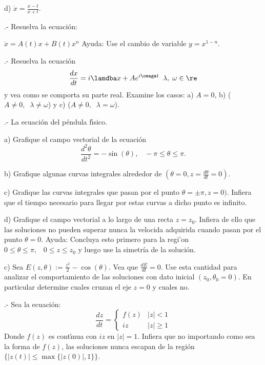 d) $\dot{x} = \frac{x-t}{x+t}$.
\ePro

.- 
Resuelva la ecuaci\'on:

$\dot{x} = A(t)x + B(t)x^n$ Ayuda: Use el cambio de variable $y = x^{1-n}$.

.-
Resuelva la ecuaci\'on
\begin{equation}
  \label{eq:osc}
  \frac{dx}{dt} = i\lamdba x + A e^{i \omaga t} \;\; \lambda, \; \omega \in \re
\end{equation}
%
y vea como se comporta su parte real.
Examine los casos: 
a) $A=0$, 
b) ($A \neq 0, \;\; \lambda \neq \omega$) y
c) ($A \neq 0, \;\; \lambda = \omega$).

.-
La ecuaci\'on del p\'endula f\'\i{}sico.

a) Grafique el campo vectorial de la ecuaci\'on
\begin{equation}
  \label{eq:pendulo_fisico}
  \frac{d^2\theta}{dt^2} = -\sin(\theta), \;\;\;-\pi \leq \theta \leq \pi. 
\end{equation}

b) Grafique algunas curvas integrales alrededor de 
$(\theta=0, z=\frac{d\theta}{dt} = 0)$.

c) Grafique las curvas integrales que pasan por el punto
$\theta = \pm \pi, z=0)$. Infiera que el tiempo necesario 
para llegar por estas curvas a dicho punto es infinito.

d) Grafique el campo vectorial a lo largo de una recta $z=z_0$.
Infiera de ello que las soluciones no pueden superar nunca la velocida adquirida cuando pasan por el punto $\theta=0$. Ayuda: Concluya esto primero para la
regi'on $0 \leq \theta \leq \pi,\;\;\; 0 \leq z \leq z_0$ y luego use la simetr\'ia de la soluci\'on.

c) Sea $E(z,\theta) := \frac{z^2}{2} - \cos(\theta)$. Vea que 
$\frac{dE}{dt} = 0$. Use esta cantidad para analizar el comportamiento
de las soluciones con dato inicial $(z_0,\theta_0=0)$. En particular
determine cuales cruzan el eje $z=0$ y cuales no.
\ePro

.-
Sea la ecuaci\'on:
\begin{equation}
  \frac{dz}{dt} = \left\{
  \begin{array}{ll}
    f(z) & |z| < 1 \\
    iz   & |z| \geq 1
  \end{array}
  \right.
\end{equation}
Donde $f(z)$ es cont\'\i{}nua con $iz$ en $|z|=1$.
Infiera que no importando como sea la forma de $f(z)$, las soluciones
nunca escapan de la regi\'on $\{|z(t)| \leq \max\{|z(0)|, 1\}\}$.
\ePro

